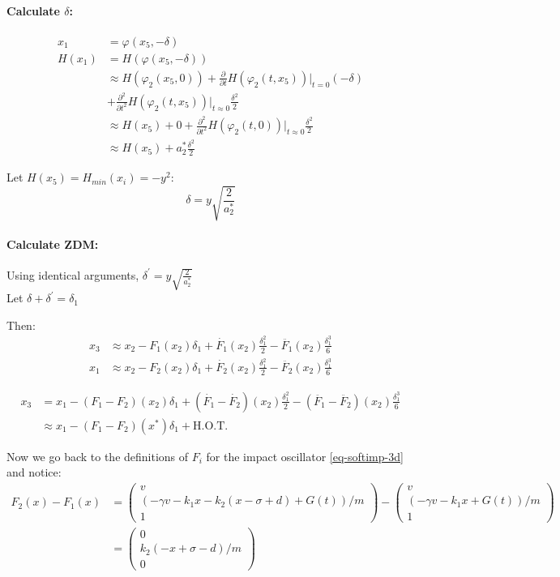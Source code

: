 \documentclass{book}
\renewcommand{\(}{\begin{columns}}
\renewcommand{\)}{\end{columns}}
\newcommand{\<}[1]{\begin{column}{#1}}
\renewcommand{\>}{\end{column}}
\newcommand{\para}{\paragraph}
\begin{document}
\para{Calculate $\delta$:}

\begin{align*}
x_1&=\varphi(x_5,-\delta)\\
H(x_1)&=H(\varphi(x_5,-\delta))\\
&\approx H(\varphi_2(x_5,0))+\frac{\partial}{\partial t}H(\varphi_2(t,x_5))\left.  
\right|_{t=0}(-\delta)\\
&+\frac{\partial^2}{\partial t^2}H(\varphi_2(t,x_5))\left.\right|_{t\approx0}\frac{\delta^2}{2}\\
&\approx H(x_5)+0+\frac{\partial^2}{\partial 
t^2}H(\varphi_2(t,0))\left.\right|_{t\approx0}\frac{\delta^2}{2}\\
&\approx H(x_5)+a_2^*\frac{\delta^2}{2}
\end{align*}

Let $H(x_5)=H_{min}(x_i)=-y^2:$ 
\begin{equation}
\label{eq-d}
\delta=y\sqrt{\frac{2}{a_2^*}}
\end{equation}


\para{Calculate ZDM:}
Using identical arguments, $\delta^{\prime}=y\sqrt{\frac{2}{a_2^*}}$ \\
Let $\delta+\delta^{\prime}=\delta_1$

Then:
\begin{align}
\label{final}
x_3&\approx x_2-F_1(x_2)\delta_1+\dot{F_1}(x_2)\frac{\delta_1^2}{2}-\ddot{F_1}(x_2)\frac{\delta_1^3}{6}\\
x_1&\approx x_2-F_2(x_2)\delta_1+\dot{F_2}(x_2)\frac{\delta_1^2}{2}-\ddot{F_2}(x_2)\frac{\delta_1^3}{6}
\end{align}

\begin{align}
\label{ZDM-final}
x_3&=x_1-(F_1-F_2)(x_2)\delta_1+(\dot{F_1}-\dot{F_2})(x_2)\frac{\delta_1^2}{2}-(\ddot{F_1}-\ddot{F_2})(x_2)\frac{\delta_1^3}{6}\\
&\approx x_1-(F_1-F_2)(x^*)\delta_1+\text{H.O.T.}
\end{align}

Now we go back to the definitions of $F_i$ for the impact oscillator 
\eqref{eq-softimp-3d} and notice:
\begin{align}
F_2(x)-F_1(x)
&=
\begin{pmatrix}
v\\
(-\gamma v-k_1x-k_2(x-\sigma+d)+G(t))/m\\
1
\end{pmatrix}
-
\begin{pmatrix}
v\\
(-\gamma v-k_1x+G(t))/m\\
1
\end{pmatrix}
\\
&=
\begin{pmatrix}
0\\
k_2(-x+\sigma-d)/m\\
0
\end{pmatrix}\end{align}
\end{document}

